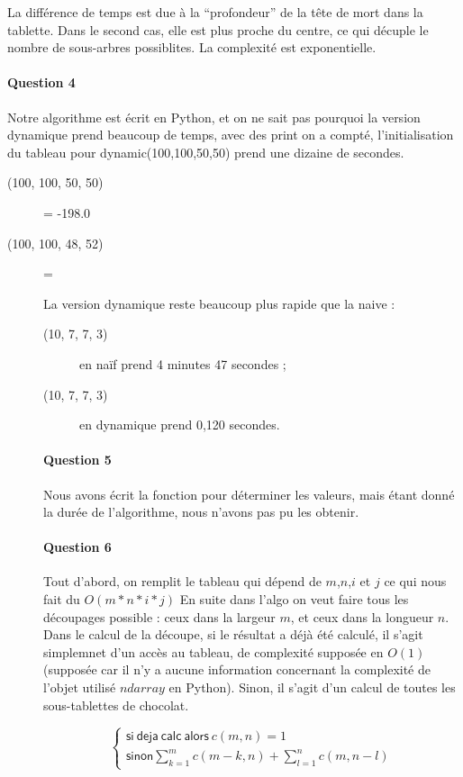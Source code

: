 \documentclass[a4paper,10pt]{article}
\begin{document}
La différence de temps est due à la “profondeur” de la tête de mort dans la tablette. Dans le second cas, elle est plus proche du centre, ce qui décuple le nombre de sous-arbres possiblites.\newline
La complexité est exponentielle.

\paragraph{Question 4}
Notre algorithme est écrit en Python, et on ne sait pas pourquoi la version dynamique prend beaucoup de temps,
avec des print on a compté, l'initialisation du tableau pour dynamic(100,100,50,50) prend une dizaine de secondes.

\begin{description}
\item [(100, 100, 50, 50)] = -198.0
\item [(100, 100, 48, 52)] =

La version dynamique reste beaucoup plus rapide que la naive :
\begin{description}
\item[(10, 7, 7, 3)] en naïf prend 4 minutes 47 secondes ;
\item[(10, 7, 7, 3)] en dynamique prend 0,120 secondes.
\end{description}

\paragraph{Question 5}
Nous avons écrit la fonction pour déterminer les valeurs, mais étant donné la durée de l’algorithme, nous n’avons pas pu les obtenir.

\paragraph{Question 6}
Tout d’abord, on remplit le tableau qui dépend de $m$,$n$,$i$ et $j$ ce qui nous fait du $O(m*n*i*j)$
En suite dans l'algo on veut faire tous les découpages possible : ceux dans la largeur $m$, et ceux dans la longueur $n$.
Dans le calcul de la découpe, si le résultat a déjà été calculé, il s’agit simplemnet d’un accès au tableau, de complexité supposée en $O(1)$ (supposée car il n’y a aucune information concernant la complexité de l'objet utilisé $ndarray$ en Python). Sinon, il s’agit d’un calcul de toutes les sous-tablettes de chocolat.

\[
\left \{
\begin{array}{c}
    \mathsf{si\: deja\: calc\: alors}\: c(m,n) = 1 \\
    \mathsf{sinon} \sum_{k=1}^m c(m-k,n) + \sum_{l=1}^n c(m,n-l) 
\end{array}
\right.
\]


\end{description}
\end{document}
